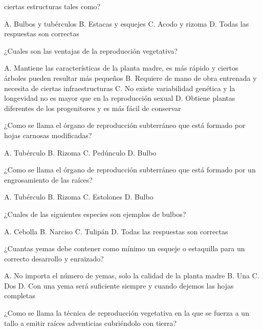 \documentclass[11pt]{exam}
\begin{document}
{\begin{questions}
  ciertas estructuras tales como?
  \begin{checkboxes}
    \CorrectChoice A. Bulbos y tubérculos
    \choice B. Estacas y esquejes
    \choice C. Acodo y rizoma
    \choice D. Todas las respuestas son correctas 
  \end{checkboxes}
\question ¿Cuales son las ventajas de la reproducción vegetativa?
  \begin{checkboxes}
    \CorrectChoice A. Mantiene las características de la planta madre, es más
    rápido y ciertos árboles pueden resultar más pequeños
    \choice B. Requiere de mano de obra entrenada y necesita de ciertas
    infraestructuras
    \choice C. No existe variabilidad genética y la longevidad no es mayor que
    en la reproducción sexual
    \choice D. Obtiene plantas diferentes de los progenitores y es más fácil de
    conservar 
  \end{checkboxes}
\question ¿Como se llama el órgano de reproducción subterráneo que está
  formado por hojas carnosas modificadas?
  \begin{checkboxes}
    \choice A. Tubérculo
    \choice B. Rizoma
    \choice C. Pedúnculo
    \CorrectChoice D. Bulbo
  \end{checkboxes}
\question ¿Como se llama el órgano de reproducción subterráneo que está formado
  por un engrosamiento de las raíces?
  \begin{checkboxes}
    \CorrectChoice A. Tubérculo
    \choice B. Rizoma
    \choice C. Estolones
    \choice D. Bulbo    
  \end{checkboxes}
\question ¿Cuales de las siguientes especies son ejemplos de bulbos?
  \begin{checkboxes}
    \choice A. Cebolla
    \choice B. Narciso
    \choice C. Tulipán
    \CorrectChoice D. Todas las respuestas son correctas 
  \end{checkboxes}
  \newpage
\question ¿Cuantas yemas debe contener como mínimo un esqueje o estaquilla para un correcto
  desarrollo y enraizado?
  \begin{checkboxes}
    \choice A. No importa el número de yemas, solo la calidad de la planta madre
    \choice B. Una
    \CorrectChoice C. Dos
    \choice D. Con una yema será suficiente siempre y cuando dejemos las hojas completas
  \end{checkboxes}
\question ¿Como se llama la técnica de reproducción vegetativa en la que se
  fuerza a un tallo a emitir raíces adventicias cubriéndolo con tierra?
  \begin{checkboxes}

\end{checkboxes}
\end{questions}}
\end{document}
